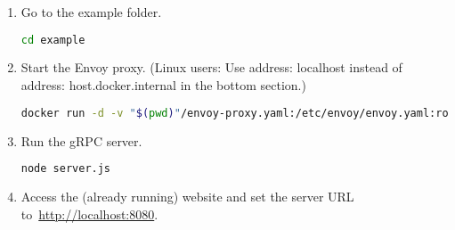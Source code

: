 \begin{enumerate}
    \item Go to the example folder.
    \begin{lstlisting}[language=bash, label={lst:documentation-testing-cd-example}]
cd example
    \end{lstlisting}

    \item Start the Envoy proxy.
    (Linux users: Use address: localhost instead of address: host.docker.internal in the bottom section.)

    \begin{lstlisting}[language=bash, label={lst:documentation-testing-envoy}, breaklines=true]
docker run -d -v "$(pwd)"/envoy-proxy.yaml:/etc/envoy/envoy.yaml:ro -p 8080:8080 -p 9901:9901 envoyproxy/envoy:v1.22.0
    \end{lstlisting}

    \item Run the gRPC server.
    \begin{lstlisting}[language=bash, label={lst:documentation-testing-node}]
node server.js
    \end{lstlisting}

    \item Access the (already running) website and set the server URL to~\url{http://localhost:8080}.

\end{enumerate}
